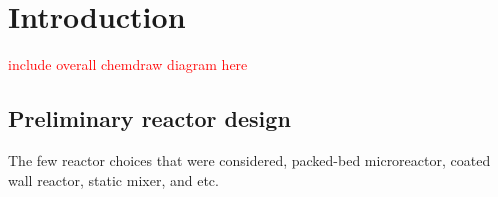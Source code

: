 \section{Introduction}
\textcolor{red}{include overall chemdraw diagram here}

\subsection{Preliminary reactor design}
The few reactor choices that were considered, packed-bed microreactor, coated wall reactor, static mixer, and etc.


